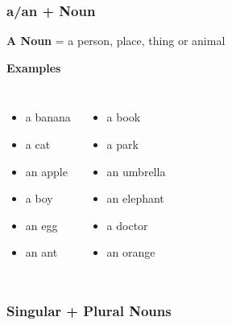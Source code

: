 \begin{frame}
	\frametitle{a/an + Noun}
	\textbf{A Noun}\; = \; a person, place, thing or animal
	\begin{center}
		\textbf{Examples}
	\end{center}
	\begin{columns}
			\begin{itemize}
				\item  a banana
				\item  a cat
				\item an apple
				\item  a boy
				\item  an egg
				\item an ant
			\end{itemize}
		\begin{itemize}
			\item  a book
			\item  a park
			\item  an umbrella
			\item  an elephant
			\item  a doctor
			\item  an orange
		\end{itemize}
	\end{columns}
\end{frame}


\begin{frame}
	\frametitle{Singular + Plural Nouns}
\end{frame}




